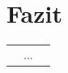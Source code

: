 \chapter{Fazit}\label{chap:fazit}

\vfill

\begin{tabularx}{1\textwidth}{ p{1 cm} X p{1 cm} }

    {} & {
        ...
    } & {}

\end{tabularx}

\vfill
